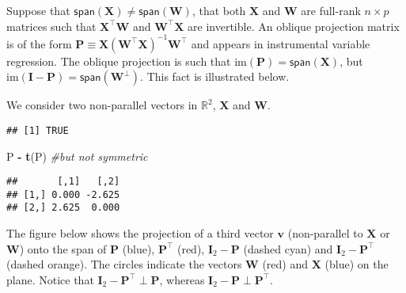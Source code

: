 \documentclass[]{book}
\newenvironment{Shaded}{\begin{snugshade}}{\end{snugshade}}
\newcommand{\KeywordTok}[1]{\textcolor[rgb]{0.13,0.29,0.53}{\textbf{#1}}}
\newcommand{\DecValTok}[1]{\textcolor[rgb]{0.00,0.00,0.81}{#1}}
\newcommand{\FloatTok}[1]{\textcolor[rgb]{0.00,0.00,0.81}{#1}}
\newcommand{\StringTok}[1]{\textcolor[rgb]{0.31,0.60,0.02}{#1}}
\newcommand{\CommentTok}[1]{\textcolor[rgb]{0.56,0.35,0.01}{\textit{#1}}}
\newcommand{\OperatorTok}[1]{\textcolor[rgb]{0.81,0.36,0.00}{\textbf{#1}}}
\newcommand{\NormalTok}[1]{#1}
\theoremstyle{definition}
\theoremstyle{definition}
\theoremstyle{definition}
\theoremstyle{remark}
\begin{document}
Suppose that
\(\mathsf{span}(\mathbf{X}) \neq \mathsf{span}(\mathbf{W})\), that both
\(\mathbf{X}\) and \(\mathbf{W}\) are full-rank \(n \times p\) matrices
such that \(\mathbf{X}^\top\mathbf{W}\) and
\(\mathbf{W}^\top\mathbf{X}\) are invertible. An oblique projection
matrix is of the form
\(\mathbf{P}\equiv\mathbf{X}(\mathbf{W}^\top\mathbf{X})^{-1}\mathbf{W}^\top\)
and appears in instrumental variable regression. The oblique projection
is such that \(\mathrm{im}(\mathbf{P})=\mathsf{span}(\mathbf{X})\), but
\(\mathrm{im}(\mathbf{I}-\mathbf{P})=\mathsf{span}(\mathbf{W}^\perp)\).
This fact is illustrated below.

We consider two non-parallel vectors in \(\mathbb{R}^2\), \(\mathbf{X}\)
and \(\mathbf{W}\).

\begin{Shaded}
\end{Shaded}

\begin{verbatim}
## [1] TRUE
\end{verbatim}

\begin{Shaded}
\begin{Highlighting}[]
\NormalTok{P }\OperatorTok{-}\StringTok{ }\KeywordTok{t}\NormalTok{(P) }\CommentTok{#but not symmetric}
\end{Highlighting}
\end{Shaded}

\begin{verbatim}
##       [,1]   [,2]
## [1,] 0.000 -2.625
## [2,] 2.625  0.000
\end{verbatim}

The figure below shows the projection of a third vector \(\mathbf{v}\)
(non-parallel to \(\mathbf{X}\) or \(\mathbf{W}\)) onto the span of
{\(\mathbf{P}\) (blue)}, {\(\mathbf{P}^\top\) (red)},
{\(\mathbf{I}_2-\mathbf{P}\) (dashed cyan)} and
{\(\mathbf{I}_2-\mathbf{P}^\top\) (dashed orange)}. The circles indicate
the vectors {\(\mathbf{W}\) (red)} and {\(\mathbf{X}\) (blue)} on the
plane. Notice that \(\mathbf{I}_2-\mathbf{P}^\top \perp \mathbf{P}\),
whereas \(\mathbf{I}_2-\mathbf{P} \perp \mathbf{P}^\top\).
\end{document}
